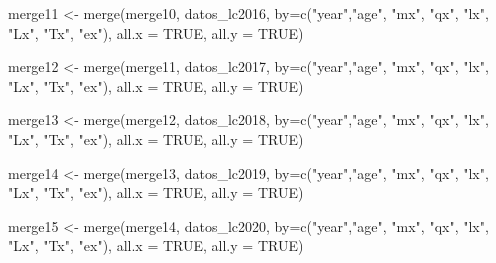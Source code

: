 \documentclass[
]{article}
\newenvironment{Shaded}{\begin{snugshade}}{\end{snugshade}}
\newcommand{\AttributeTok}[1]{\textcolor[rgb]{0.77,0.63,0.00}{#1}}
\newcommand{\ConstantTok}[1]{\textcolor[rgb]{0.00,0.00,0.00}{#1}}
\newcommand{\FunctionTok}[1]{\textcolor[rgb]{0.00,0.00,0.00}{#1}}
\newcommand{\NormalTok}[1]{#1}
\newcommand{\OtherTok}[1]{\textcolor[rgb]{0.56,0.35,0.01}{#1}}
\newcommand{\StringTok}[1]{\textcolor[rgb]{0.31,0.60,0.02}{#1}}
\begin{document}
\begin{Shaded}
\begin{Highlighting}[]
\NormalTok{merge11 }\OtherTok{\textless{}{-}} \FunctionTok{merge}\NormalTok{(merge10, datos\_lc2016, }\AttributeTok{by=}\FunctionTok{c}\NormalTok{(}\StringTok{"year"}\NormalTok{,}\StringTok{"age"}\NormalTok{, }\StringTok{"mx"}\NormalTok{, }\StringTok{"qx"}\NormalTok{, }\StringTok{"lx"}\NormalTok{, }\StringTok{"Lx"}\NormalTok{, }\StringTok{"Tx"}\NormalTok{, }\StringTok{"ex"}\NormalTok{), }\AttributeTok{all.x =} \ConstantTok{TRUE}\NormalTok{, }\AttributeTok{all.y =} \ConstantTok{TRUE}\NormalTok{)}

\NormalTok{merge12 }\OtherTok{\textless{}{-}} \FunctionTok{merge}\NormalTok{(merge11, datos\_lc2017, }\AttributeTok{by=}\FunctionTok{c}\NormalTok{(}\StringTok{"year"}\NormalTok{,}\StringTok{"age"}\NormalTok{, }\StringTok{"mx"}\NormalTok{, }\StringTok{"qx"}\NormalTok{, }\StringTok{"lx"}\NormalTok{, }\StringTok{"Lx"}\NormalTok{, }\StringTok{"Tx"}\NormalTok{, }\StringTok{"ex"}\NormalTok{), }\AttributeTok{all.x =} \ConstantTok{TRUE}\NormalTok{, }\AttributeTok{all.y =} \ConstantTok{TRUE}\NormalTok{)}

\NormalTok{merge13 }\OtherTok{\textless{}{-}} \FunctionTok{merge}\NormalTok{(merge12, datos\_lc2018, }\AttributeTok{by=}\FunctionTok{c}\NormalTok{(}\StringTok{"year"}\NormalTok{,}\StringTok{"age"}\NormalTok{, }\StringTok{"mx"}\NormalTok{, }\StringTok{"qx"}\NormalTok{, }\StringTok{"lx"}\NormalTok{, }\StringTok{"Lx"}\NormalTok{, }\StringTok{"Tx"}\NormalTok{, }\StringTok{"ex"}\NormalTok{), }\AttributeTok{all.x =} \ConstantTok{TRUE}\NormalTok{, }\AttributeTok{all.y =} \ConstantTok{TRUE}\NormalTok{)}

\NormalTok{merge14 }\OtherTok{\textless{}{-}} \FunctionTok{merge}\NormalTok{(merge13, datos\_lc2019, }\AttributeTok{by=}\FunctionTok{c}\NormalTok{(}\StringTok{"year"}\NormalTok{,}\StringTok{"age"}\NormalTok{, }\StringTok{"mx"}\NormalTok{, }\StringTok{"qx"}\NormalTok{, }\StringTok{"lx"}\NormalTok{, }\StringTok{"Lx"}\NormalTok{, }\StringTok{"Tx"}\NormalTok{, }\StringTok{"ex"}\NormalTok{), }\AttributeTok{all.x =} \ConstantTok{TRUE}\NormalTok{, }\AttributeTok{all.y =} \ConstantTok{TRUE}\NormalTok{)}

\NormalTok{merge15 }\OtherTok{\textless{}{-}} \FunctionTok{merge}\NormalTok{(merge14, datos\_lc2020, }\AttributeTok{by=}\FunctionTok{c}\NormalTok{(}\StringTok{"year"}\NormalTok{,}\StringTok{"age"}\NormalTok{, }\StringTok{"mx"}\NormalTok{, }\StringTok{"qx"}\NormalTok{, }\StringTok{"lx"}\NormalTok{, }\StringTok{"Lx"}\NormalTok{, }\StringTok{"Tx"}\NormalTok{, }\StringTok{"ex"}\NormalTok{), }\AttributeTok{all.x =} \ConstantTok{TRUE}\NormalTok{, }\AttributeTok{all.y =} \ConstantTok{TRUE}\NormalTok{)}


\end{Highlighting}
\end{Shaded}
\end{document}
